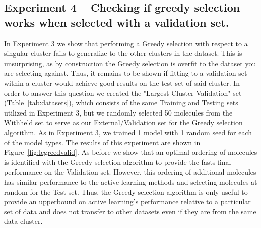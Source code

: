 \documentclass[journal=jmcmar,manuscript=article]{achemso}
\begin{document}
\subsection{Experiment 4 -- Checking if greedy selection works when selected with a validation set.}

In Experiment 3 we show that performing a Greedy selection with respect to a singular cluster fails to generalize to the other clusters in the dataset. This is unsurprising, as by construction the Greedy selection is overfit to the dataset you are selecting against. Thus, it remains to be shown if fitting to a validation set within a cluster would achieve good results on the test set of said cluster. In order to answer this question we created the "Largest Cluster Validation" set (Table~\ref{tab:datasets}), which consists of the same Training and Testing sets utilized in Experiment 3, but we randomly selected 50 molecules from the Withheld set to serve as our External/Validation set for the Greedy selection algorithm. As in Experiment 3, we trained 1 model with 1 random seed for each of the model types. The results of this experiment are shown in Figure~\ref{fig:lcgreedvalid}. As before we show that an optimal ordering of molecules is identified with the Greedy selection algorithm to provide the fasts final performance on the Validation set. However, this ordering of additional molecules has similar performance to the active learning methods and selecting molecules at random for the Test set. Thus, the Greedy selection algorithm is only useful to provide an upperbound on active learning's performance relative to a particular set of data and does not transfer to other datasets even if they are from the same data cluster.
\end{document}
